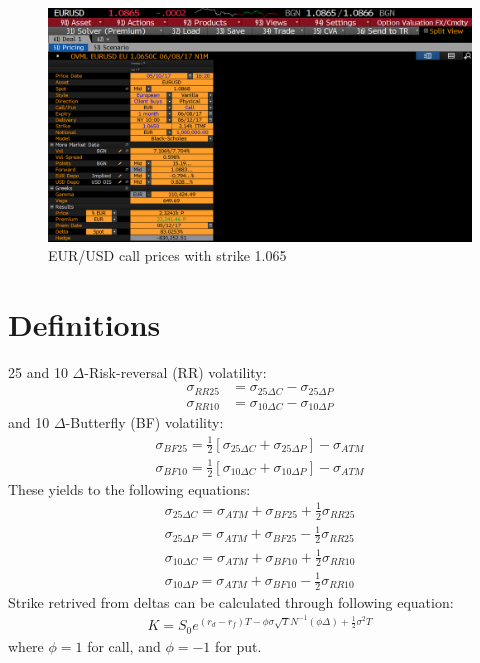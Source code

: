 \begin{figure}[htb]
	\centering
	\includegraphics[scale=0.3]{./Testing-data/Price-Bloomberg/EURUSD1065.PNG} 
	\caption{EUR/USD call prices with strike 1.065}
	
	\label{fig:prices-investing.com} %
\end{figure}

\section{Definitions}
25 and 10 $\Delta$-Risk-reversal (RR) volatility:
\begin{align}
\sigma_{RR25}&=\sigma_{25\Delta C}-\sigma_{25\Delta P}\\
\sigma_{RR10}&=\sigma_{10\Delta C}-\sigma_{10\Delta P}
\end{align}
 and 10 $\Delta$-Butterfly (BF) volatility:
\begin{align}
\sigma_{BF25}=\frac{1}{2}\left[\sigma_{25\Delta C}+\sigma_{25\Delta P}\right]-\sigma_{ATM}\\
\sigma_{BF10}=\frac{1}{2}\left[\sigma_{10\Delta C}+\sigma_{10\Delta P}\right]-\sigma_{ATM}
\end{align}
\newline
These yields to the following equations:
\begin{align}
\sigma_{25\Delta C}=\sigma_{ATM}+\sigma_{BF25}+\frac{1}{2}\sigma_{RR25}\\
\sigma_{25\Delta P}=\sigma_{ATM}+\sigma_{BF25}-\frac{1}{2}\sigma_{RR25}\\
\sigma_{10\Delta C}=\sigma_{ATM}+\sigma_{BF10}+\frac{1}{2}\sigma_{RR10}\\
\sigma_{10\Delta P}=\sigma_{ATM}+\sigma_{BF10}-\frac{1}{2}\sigma_{RR10}
\end{align}
\newline
Strike retrived from deltas can be calculated through following equation:
\begin{align}
K=S_0e^{(r_d-r_f)T-\phi \sigma \sqrt{T} N^{-1}(\phi \Delta)+\frac{1}{2}\sigma^2T}
\end{align}
where $\phi=1$ for call, and $\phi=-1$ for put.

